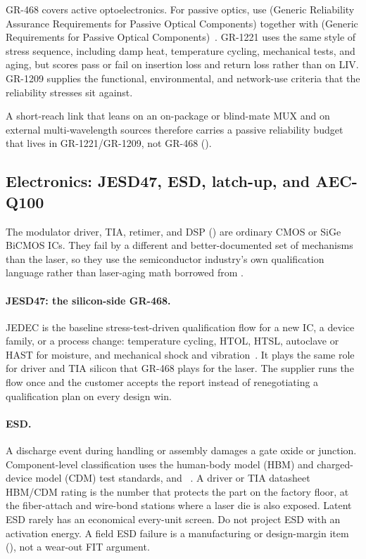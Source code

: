 GR-468 covers active optoelectronics. For passive optics, use  (Generic Reliability Assurance Requirements for Passive Optical
Components) together with  (Generic Requirements for Passive
Optical Components)~. GR-1221 uses the same style of
stress sequence, including damp heat, temperature cycling, mechanical tests,
and aging, but scores pass or fail on insertion loss and return loss rather
than on LIV. GR-1209 supplies the functional, environmental, and network-use
criteria that the reliability stresses sit against.

A short-reach link that leans on an on-package or blind-mate MUX and on
external multi-wavelength sources therefore carries a passive reliability
budget that lives in GR-1221/GR-1209, not GR-468
().

\subsection{Electronics: JESD47, ESD, latch-up, and AEC-Q100}
\label{sec:ic-reliability}

The modulator driver, TIA, retimer, and DSP () are
ordinary CMOS or SiGe BiCMOS ICs. They fail by a different and
better-documented set of mechanisms than the laser, so they use the
semiconductor industry's own qualification language rather than laser-aging
math borrowed from .

\paragraph{JESD47: the silicon-side GR-468.}
JEDEC  is the baseline stress-test-driven qualification flow for a
new IC, a device family, or a process change: temperature cycling, HTOL, HTSL,
autoclave or HAST for moisture, and mechanical shock and
vibration~. It plays the same role for driver and TIA silicon
that GR-468 plays for the laser. The supplier runs the flow once and the
customer accepts the report instead of renegotiating a qualification plan on
every design win.

\paragraph{ESD.}
A discharge event during handling or assembly damages a gate oxide or junction.
Component-level classification uses the human-body model (HBM) and charged-device
model (CDM) test standards,  and
~. A driver or TIA datasheet HBM/CDM rating is the
number that protects the part on the factory floor, at the fiber-attach and
wire-bond stations where a laser die is also exposed. Latent ESD rarely has an
economical every-unit screen. Do not project ESD with an activation energy. A
field ESD failure is a manufacturing or design-margin item
(), not a wear-out FIT argument.

